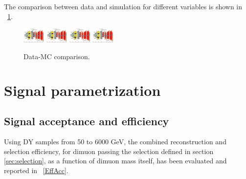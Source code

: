 The comparison between data and simulation for different variables is shown in \figurename~\ref{Variables_DataMC}.
\begin{figure}[htbp]
\centering
\includegraphics[width=0.1\textwidth]{Images/ParticleFlow}
\includegraphics[width=0.1\textwidth]{Images/ParticleFlow}
\includegraphics[width=0.1\textwidth]{Images/ParticleFlow}
\includegraphics[width=0.1\textwidth]{Images/ParticleFlow}
\caption{Data-MC comparison.}
\label{Variables_DataMC} 
\end{figure}


\section{Signal parametrization}
\subsection{Signal acceptance and efficiency}
Using DY samples from 50 to 6000 GeV, the combined reconstruction and selection efficiency, for dimuon passing the selection defined in section \ref{sec:selection}, as a function of dimuon mass itself, has been evaluated and reported in \figurename~\ref{EffAcc}. 

